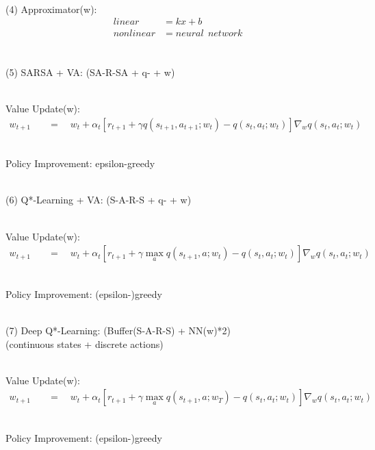 \documentclass{article}
\begin{document}
~ \\[3pt]
(4) Approximator(w): 
\begin{align*}
    linear    &= kx + b \\[3pt]
    nonlinear &= neural \ \ network \\[3pt]
\end{align*}


\newpage


~ \\[3pt]
(5) SARSA + VA: \qquad (SA-R-SA + q- + w) 

~ \\[3pt]
Value Update(w): 
\begin{align*}
    w_{t+1} & 
            \quad = \quad w_{t} + \alpha_{t} 
            [ r_{t+1} + \gamma q(s_{t+1}, a_{t+1}; w_{t}) 
            - q(s_{t}, a_{t}; w_{t}) ] 
            \nabla_{w} q(s_{t}, a_{t}; w_{t}) 
\end{align*}

~ \\[3pt]
Policy Improvement: epsilon-greedy


~ \\[48pt]
(6) Q*-Learning + VA: \qquad (S-A-R-S + q- + w) 

~ \\[3pt]
Value Update(w): 
\begin{align*}
    w_{t+1} & 
            \quad = \quad w_{t} + \alpha_{t} 
            [ r_{t+1} + \gamma \max_{a} q(s_{t+1}, a; w_{t}) 
            - q(s_{t}, a_{t}; w_{t}) ] 
            \nabla_{w} q(s_{t}, a_{t}; w_{t}) 
\end{align*}

~ \\[3pt]
Policy Improvement: (epsilon-)greedy 


~ \\[48pt]
(7) Deep Q*-Learning: \qquad (Buffer(S-A-R-S) + NN(w)*2) \\[3pt]
\qquad (continuous states + discrete actions)

~ \\[3pt]
Value Update(w): 
\begin{align*}
    w_{t+1} & 
            \quad = \quad w_{t} + \alpha_{t} 
            [ r_{t+1} + \gamma \max_{a} q(s_{t+1}, a; w_{T}) 
            - q(s_{t}, a_{t}; w_{t}) ] 
            \nabla_{w} q(s_{t}, a_{t}; w_{t}) 
\end{align*}

~ \\[3pt]
Policy Improvement: (epsilon-)greedy 
\end{document}
